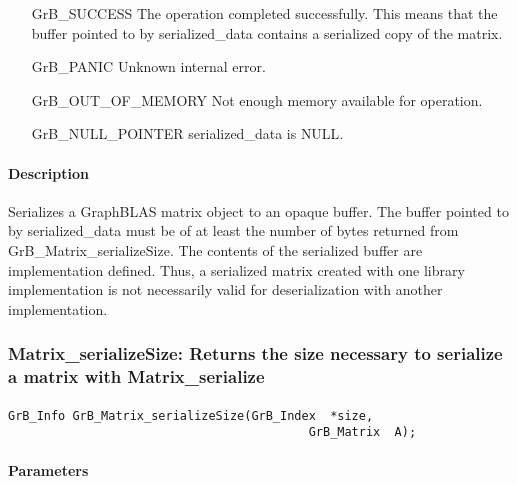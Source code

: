 \begin{itemize}[leftmargin=2.3in]
    \item[{\sf GrB\_SUCCESS}]         The operation completed successfully. This
      means that the buffer pointed to by {\sf serialized\_data} contains a
      serialized copy of the matrix.

    \item[{\sf GrB\_PANIC}]           Unknown internal error.
    
    \item[{\sf GrB\_OUT\_OF\_MEMORY}] Not enough memory available for operation.
    
    \item[{\sf GrB\_NULL\_POINTER}]  {\sf serialized\_data} is {\sf NULL}.
\end{itemize}

\paragraph{Description}

Serializes a GraphBLAS matrix object to an opaque buffer.  The buffer pointed to
by {\sf serialized\_data} must be of at least the number of bytes returned
from {\sf GrB\_Matrix\_serializeSize}.  The contents of the serialized buffer
are implementation defined.  Thus, a serialized matrix created with one library
implementation is not necessarily valid for deserialization with another implementation.


\subsubsection{{\sf Matrix\_serializeSize}: Returns the size necessary to serialize a matrix with {\sf Matrix\_serialize} }
\label{Sec:Matrix_serializeSize}

\paragraph{\syntax}

\begin{Verbatim}[samepage=true]
        GrB_Info GrB_Matrix_serializeSize(GrB_Index  *size,
                                          GrB_Matrix  A);
\end{Verbatim}

\paragraph{Parameters}

